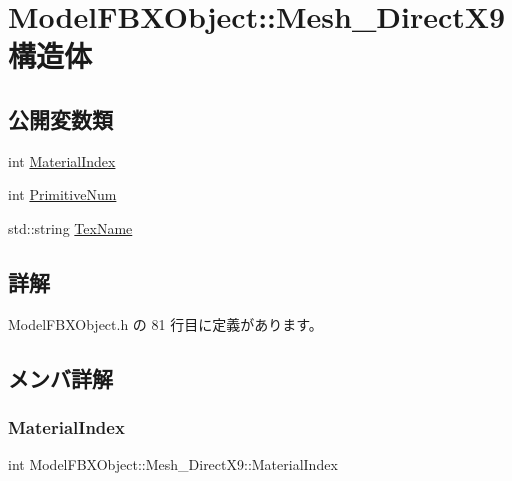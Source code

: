 \hypertarget{struct_model_f_b_x_object_1_1_mesh___direct_x9}{}\section{Model\+F\+B\+X\+Object\+:\+:Mesh\+\_\+\+Direct\+X9 構造体}
\label{struct_model_f_b_x_object_1_1_mesh___direct_x9}
\subsection*{公開変数類}
\begin{DoxyCompactItemize}
\item 
int \mbox{\hyperlink{struct_model_f_b_x_object_1_1_mesh___direct_x9_ae48b5471e88d02467b1043fe340024a8}{Material\+Index}}
\item 
int \mbox{\hyperlink{struct_model_f_b_x_object_1_1_mesh___direct_x9_a1ecceb59e4c84c47d31c14b602d074e3}{Primitive\+Num}}
\item 
std\+::string \mbox{\hyperlink{struct_model_f_b_x_object_1_1_mesh___direct_x9_abc18274f1ae9a61c823740d67ef123b4}{Tex\+Name}}
\end{DoxyCompactItemize}


\subsection{詳解}


 Model\+F\+B\+X\+Object.\+h の 81 行目に定義があります。



\subsection{メンバ詳解}
\mbox{\label{struct_model_f_b_x_object_1_1_mesh___direct_x9_ae48b5471e88d02467b1043fe340024a8}} 
\subsubsection{\texorpdfstring{Material\+Index}{MaterialIndex}}
{\footnotesize\ttfamily int Model\+F\+B\+X\+Object\+::\+Mesh\+\_\+\+Direct\+X9\+::\+Material\+Index}



